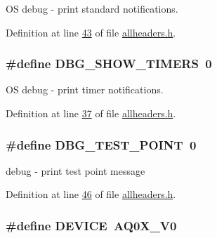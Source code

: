 O\+S debug -\/ print standard notifications. 



Definition at line \hyperlink{a00040_source_l00043}{43} of file \hyperlink{a00040_source}{allheaders.\+h}.

\hypertarget{a00040_a696094a227f00f646c71694eba56c239}{
\subsubsection[{D\+B\+G\+\_\+\+S\+H\+O\+W\+\_\+\+T\+I\+M\+E\+R\+S}]{\setlength{\rightskip}{0pt plus 5cm}\#define D\+B\+G\+\_\+\+S\+H\+O\+W\+\_\+\+T\+I\+M\+E\+R\+S~0}}\label{a00040_a696094a227f00f646c71694eba56c239}


O\+S debug -\/ print timer notifications. 



Definition at line \hyperlink{a00040_source_l00037}{37} of file \hyperlink{a00040_source}{allheaders.\+h}.

\hypertarget{a00040_ae48f2746c700061f944a2747a966863c}{
\subsubsection[{D\+B\+G\+\_\+\+T\+E\+S\+T\+\_\+\+P\+O\+I\+N\+T}]{\setlength{\rightskip}{0pt plus 5cm}\#define D\+B\+G\+\_\+\+T\+E\+S\+T\+\_\+\+P\+O\+I\+N\+T~0}}\label{a00040_ae48f2746c700061f944a2747a966863c}


debug -\/ print test point message 



Definition at line \hyperlink{a00040_source_l00046}{46} of file \hyperlink{a00040_source}{allheaders.\+h}.

\hypertarget{a00040_a775d096fbc3988fb7ed858b79ef44e22}{
\subsubsection[{D\+E\+V\+I\+C\+E}]{\setlength{\rightskip}{0pt plus 5cm}\#define D\+E\+V\+I\+C\+E~{\bf A\+Q0\+X\+\_\+\+V0}}}\label{a00040_a775d096fbc3988fb7ed858b79ef44e22}



